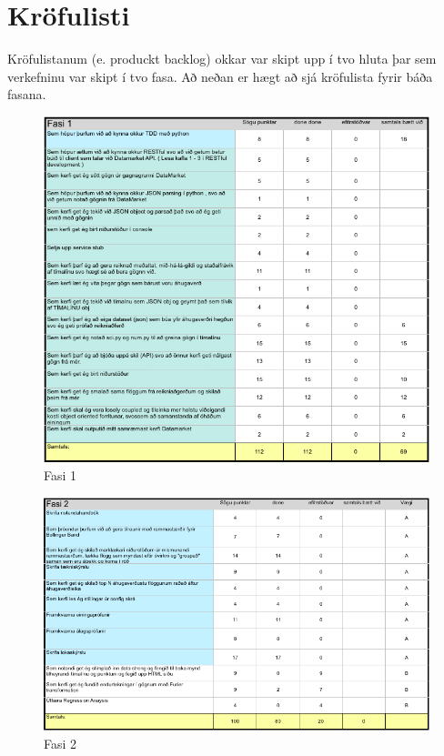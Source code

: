 \documentclass{article}
\begin{document}
\raggedright

\tableofcontents
\newpage
\section{Kröfulisti}
Kröfulistanum (e. produckt backlog) okkar var skipt upp í tvo hluta þar sem verkefninu 
var skipt í tvo fasa. Að neðan er hægt að sjá kröfulista fyrir báða fasana.

\begin{figure}[H]
  \centering
  \includegraphics[width=1\textwidth]{Fasi1.png} 
  \caption{Fasi 1} 
\end{figure}

\begin{figure}[H]
  \centering
  \includegraphics[width=1\textwidth]{Fasi2.png} 
  \caption{Fasi 2} 
\end{figure}
\end{document}
